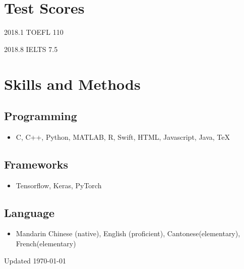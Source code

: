 \documentclass{academiccv}
\begin{document}
\section*{Test Scores}

\begin{tablist}
	\item[2018.1] \tab TOEFL 110
	\item[2018.8] \tab IELTS 7.5
	\end{tablist}


\section*{Skills and Methods}

\subsection*{Programming}
\begin{itemize}
	\item C, C++, Python, MATLAB, R, Swift, HTML, Javascript, Java, \TeX{}
\end{itemize}

\subsection*{Frameworks}
\begin{itemize}
	\item Tensorflow, Keras, PyTorch
\end{itemize}

\subsection*{Language}

\begin{itemize}
	\item  Mandarin Chinese (native), English (proficient), Cantonese(elementary), French(elementary)
\end{itemize}



\begin{center}
\vspace{6em}
Updated \monthyeardate\today
\end{center}
\end{document}

